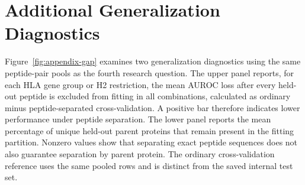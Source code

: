 \section{Additional Generalization Diagnostics}

Figure~\ref{fig:appendix-gap} examines two generalization diagnostics using the same peptide-pair pools as the fourth research question. The upper panel reports, for each HLA gene group or H2 restriction, the mean AUROC loss after every held-out peptide is excluded from fitting in all combinations, calculated as ordinary minus peptide-separated cross-validation. A positive bar therefore indicates lower performance under peptide separation. The lower panel reports the mean percentage of unique held-out parent proteins that remain present in the fitting partition. Nonzero values show that separating exact peptide sequences does not also guarantee separation by parent protein. The ordinary cross-validation reference uses the same pooled rows and is distinct from the saved internal test set.

